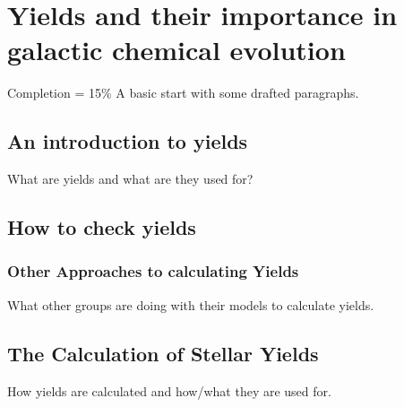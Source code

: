 \chapter{Yields and their importance in galactic chemical evolution}

Completion = 15\%
A basic start with some drafted paragraphs.

\section{An introduction to yields}

What are yields and what are they used for?

\section{How to check yields}

\subsection{Other Approaches to calculating Yields}

What other groups are doing with their models to calculate yields.

\section{The Calculation of Stellar Yields}

How yields are calculated and how/what they are used for.
